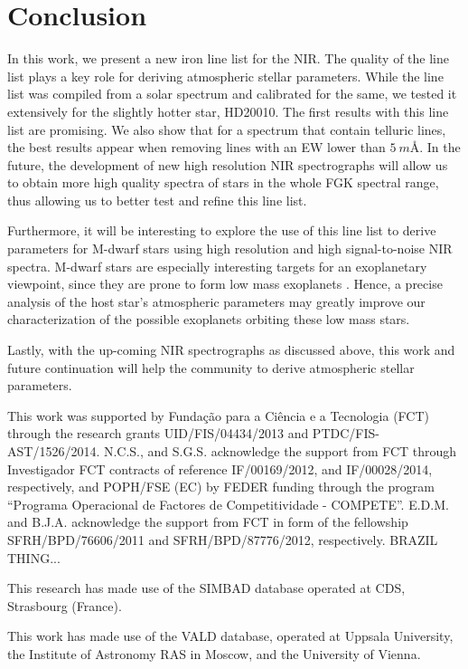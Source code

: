 \documentclass{aa}
\begin{document}
\section{Conclusion}
\label{sec:conclusion}

In this work, we present a new iron line list for the NIR. The quality
of the line list plays a key role for deriving atmospheric stellar
parameters. While the line list was compiled from a solar spectrum and
calibrated for the same, we tested it extensively for the slightly
hotter star, HD20010. The first results with this line list are
promising. We also show that for a spectrum that contain telluric
lines, the best results appear when removing lines with an EW lower than
$\SI{5}{m\angstrom}$. In the future, the development of new high
resolution NIR spectrographs will allow us to obtain more high quality
spectra of stars in the whole FGK spectral range, thus allowing us to
better test and refine this line list.

Furthermore, it will be interesting to explore the use of this line list
to derive parameters for M-dwarf stars using high resolution and high
signal-to-noise NIR spectra. M-dwarf stars are especially interesting
targets for an exoplanetary viewpoint, since they are prone to form
low mass exoplanets \citep{Bonfils2013}. Hence, a precise analysis
of the host star's atmospheric parameters may greatly improve our
characterization of the possible exoplanets orbiting these low mass
stars.

Lastly, with the up-coming NIR spectrographs as discussed above,
this work and future continuation will help the community to derive
atmospheric stellar parameters.



\begin{acknowledgements}

This work was supported by Funda\c{c}\~ao para a Ci\^encia e a
Tecnologia (FCT) through the research grants UID/FIS/04434/2013
and PTDC/FIS-AST/1526/2014. N.C.S., and S.G.S. acknowledge the
support from FCT through Investigador FCT contracts of reference
IF/00169/2012, and IF/00028/2014, respectively, and POPH/FSE (EC)
by FEDER funding through the program “Programa Operacional de
Factores de Competitividade - COMPETE”. E.D.M. and B.J.A. acknowledge
the support from FCT in form of the fellowship SFRH/BPD/76606/2011 and
SFRH/BPD/87776/2012, respectively.
BRAZIL THING...

This research has made use of the SIMBAD database operated at CDS,
Strasbourg (France).

This work has made use of the VALD database, operated at Uppsala
University, the Institute of Astronomy RAS in Moscow, and the University
of Vienna.

\end{acknowledgements}








\end{document}
